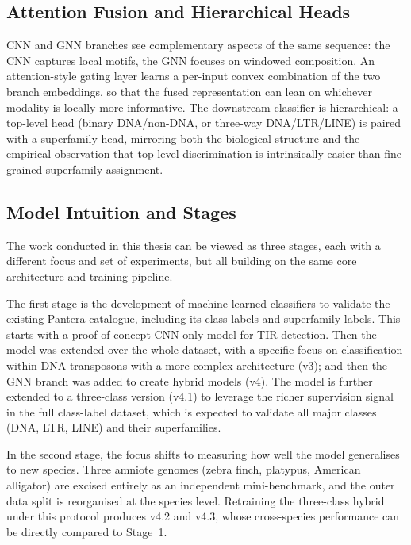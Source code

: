 \documentclass[12pt]{article}
\begin{document}
\subsection{Attention Fusion and Hierarchical Heads}

CNN and GNN branches see complementary aspects of the same sequence: the CNN captures local motifs, the GNN focuses on windowed composition. An attention-style gating layer \cite{vaswani2017attention} learns a per-input convex combination of the two branch embeddings, so that the fused representation can lean on whichever modality is locally more informative. The downstream classifier is hierarchical: a top-level head (binary DNA/non-DNA, or three-way DNA/LTR/LINE) is paired with a superfamily head, mirroring both the biological structure and the empirical observation that top-level discrimination is intrinsically easier than fine-grained superfamily assignment.

\subsection{Model Intuition and Stages}\label{ssec:model_stages}

The work conducted in this thesis can be viewed as three stages, each with a different focus and set of experiments, but all building on the same core architecture and training pipeline. 

The first stage is the development of machine-learned classifiers to validate the existing Pantera catalogue, including its class labels and superfamily labels. This starts with a proof-of-concept CNN-only model for TIR detection. Then the model was extended over the whole dataset,  with a specific focus on classification within DNA transposons with a more complex architecture (v3); and then the GNN branch was added to create hybrid models (v4). The model is further extended to a three-class version (v4.1) to leverage the richer supervision signal in the full class-label dataset, which is expected to validate all major classes (DNA, LTR, LINE) and their superfamilies. 

In the second stage, the focus shifts to measuring how well the model generalises to new species. Three amniote genomes (zebra finch, platypus, American alligator) are excised entirely as an independent mini-benchmark, and the outer data split is reorganised at the species level. Retraining the three-class hybrid under this protocol produces v4.2 and v4.3, whose cross-species performance can be directly compared to Stage~1.
\end{document}
